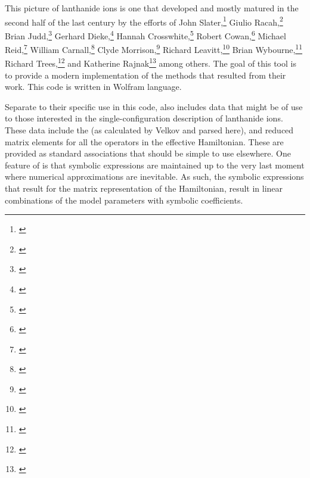 \documentclass[11pt, twoside,openright]{article}
\begin{document}
This picture of lanthanide ions is one that developed and mostly matured in the second half of the last century by the efforts of 
John Slater,\footnote{\cite{slater_theory_1929}}
Giulio Racah,\footnote{\cite{racah_theory_1942-1,racah_theory_1942,racah_theory_1943,racah_theory_1949}}
Brian Judd,\footnote{\cite{judd_optical_1962,judd_operator_1963,judd_configuration_1963,judd_three-particle_1966,judd_second_1967,judd_intra-atomic_1968,crosswhite_magnetic_1968,judd_parametric_1982,judd_operator_1983,judd_complete_1984,judd_orthogonalized_1984,judd_complex_1985,judd_classification_1986,judd_atomic_1988,judd_developments_1989,judd_symmetries_1993,judd_group_1996,judd_interaction_2005}}
Gerhard Dieke,\footnote{\cite{dieke_spectra_1963,piksis_energy_1967,dieke_spectra_1968}}
Hannah Crosswhite,\footnote{\cite{crosswhite_magnetic_1968,crosswhite_effective_1971,crosswhite_spectrum_1976,crosswhite_parametric_1977,dieke_spectra_1963,judd_intra-atomic_1968,judd_orthogonalized_1984}}
Robert Cowan,\footnote{\cite{cowan_theory_1981}}
Michael Reid,\footnote{\cite{reid_applications_1981}}
William Carnall,\footnote{\cite{carnall_spectral_1965,carnall_systematic_1989,carnall_systematic_1992,carnall_electronic_1968-1,carnall_spectral_1968,carnall_electronic_1968-2,carnall_electronic_1968-3,carnall_electronic_1968,carnall_absorption_1970,carnall_energy_1976,gorller-walrand_magnetic_1991}}
Clyde Morrison,\footnote{\cite{morrison_crystal-field_1976,morrison_crystal-field_1979,morrison_energy_1994,morrison_host_1980,morrison_analysis_1987,morrison_theoretical_1977,morrison_rare-earth_1977,morrison_spectroscopic_1982,morrison_optical_1983}}
Richard Leavitt,\footnote{\cite{leavitt_complete_1987,leavitt_role_1982,leavitt_crystal-field_1980,morrison_crystal-field_1979,morrison_spectroscopic_1982}}
Brian Wybourne,\footnote{\cite{carnall_spectral_1965,conway_low-lying_1963,rajnak_configuration_1963,rajnak_electrostatically_1964,rajnak_configuration_1964,wybourne_low-lying_1964,wybourne_orbitorbit_1964,wybourne_spectroscopic_1965,wybourne_symmetry_1970,wybourne_optical_2007}}
Richard Trees,\footnote{\cite{trees_l_1952,trees_spin-spin_1951,trees_comparison_1958}}
and Katherine Rajnak\footnote{\cite{rajnak_configuration_1963,rajnak_electrostatically_1964,rajnak_configuration_1964,rajnak_configuration_1965}} among others. The goal of this tool is to provide a modern implementation of the methods that resulted from their work. This code is written in Wolfram language.

Separate to their specific use in this code, \qlanth also includes data that might be of use to those interested in the single-configuration description of lanthanide ions. These data include the \cfps (as calculated by Velkov and parsed here), and reduced matrix elements for all the operators in the effective Hamiltonian. These are provided as standard \mathematica associations that should be simple to use elsewhere. One feature of \qlanth is that symbolic expressions are maintained up to the very last moment where numerical approximations are inevitable. As such, the symbolic expressions that result for the matrix representation of the Hamiltonian, result in linear combinations of the model parameters with symbolic coefficients.
\end{document}
